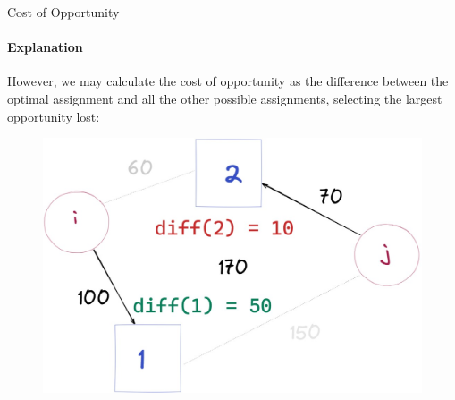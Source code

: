 \documentclass{beamer}
\begin{document}
\begin{frame}{Cost of Opportunity}
    \framesubtitle{Explanation}
    However, we may calculate the cost of opportunity as the difference between the optimal assignment and all the other possible assignments, selecting the largest opportunity lost:
    \begin{figure}
        \centering
        \includegraphics[scale=0.25]{Screenshot_3}
    \end{figure}
\end{frame}
\end{document}
